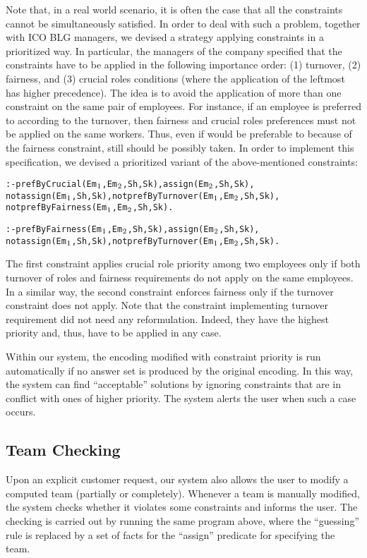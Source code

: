 \documentclass{tlp}
\begin{document}
Note that, in a real world scenario, it is often the case that
all the constraints cannot be simultaneously satisfied.
In order to deal with such a problem, together with ICO BLG managers, we devised a strategy applying
constraints in a prioritized way.
In particular, the managers of the company specified that the constraints
have to be applied in the following importance order:
(1) turnover, (2) fairness, and (3) crucial roles conditions
(where the application of the leftmost has higher precedence).
The idea is to avoid the application of more than one constraint on the same pair of employees.
For instance, if an employee  is preferred to  according to the turnover,
then fairness and crucial roles preferences must not be applied on the same workers.
Thus, even if  would be preferable to  because of the fairness constraint,
still  should be possibly taken.
In order to implement this specification,
we devised a prioritized variant of the above-mentioned constraints:
\begin{alltt}\small
 :- prefByCrucial(Em\(\sb{1}\),Em\(\sb{2}\),Sh,Sk), assign(Em\(\sb{2}\),Sh,Sk),
    not assign(Em\(\sb{1}\),Sh,Sk), not prefByTurnover(Em\(\sb{1}\),Em\(\sb{2}\),Sh,Sk),
    not prefByFairness(Em\(\sb{1}\),Em\(\sb{2}\),Sh,Sk).

 :- prefByFairness(Em\(\sb{1}\),Em\(\sb{2}\),Sh,Sk), assign(Em\(\sb{2}\),Sh,Sk),
    not assign(Em\(\sb{1}\),Sh,Sk), not prefByTurnover(Em\(\sb{1}\),Em\(\sb{2}\),Sh,Sk).
\end{alltt}\normalsize
The first constraint applies crucial role priority among two employees
only if both turnover of roles and fairness requirements do not apply on the same employees.
In a similar way, the second constraint enforces fairness only if the turnover constraint
does not apply.
Note that the constraint implementing turnover requirement did not need any reformulation.
Indeed, they have the highest priority and, thus, have to be applied in any case.

Within our system, the encoding modified with constraint priority is run automatically
if no answer set is produced by the original encoding.
In this way, the system can find ``acceptable'' solutions
by ignoring constraints that are in conflict with ones of higher priority.
The system alerts the user when such a case occurs.


\subsection{Team Checking}
Upon an explicit customer request,
our system also allows the user to modify a computed team (partially or completely).
Whenever a team is manually modified,
the system checks whether it violates some constraints and informs the user.
The checking is carried out by running the same program above,
where the ``guessing'' rule is replaced by a set of facts for the ``assign''
predicate for specifying the team.
\end{document}
